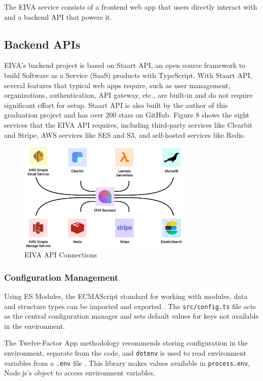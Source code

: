 \documentclass{article}
\begin{document}
The EIVA service consists of a frontend web app that users directly interact with and a backend API that powers it.

\subsection{Backend APIs}

EIVA's backend project is based on Staart API, an open source framework to build Software as a Service (SaaS) products with TypeScript. With Staart API, several features that typical web apps require, such as user management, organizations, authentication, API gateway, etc., are built-in and do not require significant effort for setup. Staart API is also built by the author of this graduation project and has over 200 stars on GitHub. Figure 8 shows the eight services that the EIVA API requires, including third-party services like Clearbit and Stripe, AWS services like SES and S3, and self-hosted services like Redis.

\begin{figure}[h!]
	\centering
	\includegraphics[width=0.75\textwidth]{services.png}
	\caption{EIVA API Connections}
	\label{fig:checkbox}
\end{figure}

\subsubsection{Configuration Management}

Using ES Modules, the ECMAScript standard for working with modules, data and structure types can be imported and exported \cite{noauthor_es_nodate}. The \texttt{src/config.ts} file acts as the central configuration manager and sets default values for keys not available in the environment.

The Twelve-Factor App methodology recommends storing configuration in the environment, separate from the code, and \texttt{dotenv} is used to read environment variables from a \texttt{.env} file \cite{noauthor_twelve-factor_nodate}. This library makes values available in \texttt{process.env}, Node.js's object to access environment variables.
\end{document}

